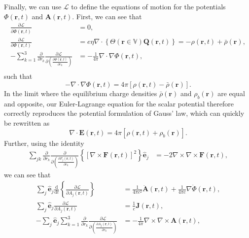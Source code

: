 \documentclass{article}
\begin{document}
Finally, we can use $\mathcal{L}$ to define the equations of motion for the potentials $\Phi(\mathbf{r},t)$ and $\mathbf{A}(\mathbf{r},t)$. First, we can see that 
\begin{equation}
\begin{split}
\frac{\partial\mathcal{L}}{\partial\dot{\Phi}(\mathbf{r},t)} &= 0,\\
\frac{\partial \mathcal{L}}{\partial \Phi(\mathbf{r},t)} &= e\eta\nabla\cdot\left\{\Theta(\mathbf{r}\in\mathbb{V})\mathbf{Q}(\mathbf{r},t)\right\}= -\rho(\mathbf{r},t) + \bar{\rho}(\mathbf{r}),\\
-\sum_{k = 1}^3\frac{\partial}{\partial r_k}\frac{\partial \mathcal{L}}{\partial\left(\frac{\partial\Phi(\mathbf{r},t)}{\partial r_k}\right)} &= -\frac{1}{4\pi}\nabla\cdot\nabla\Phi(\mathbf{r},t),\\
\end{split}
\end{equation}
such that
\begin{equation}\label{eq:poisson1}
-\nabla\cdot\nabla\Phi(\mathbf{r},t) = 4\pi\left[\rho(\mathbf{r},t) - \bar{\rho}(\mathbf{r})\right].
\end{equation}
In the limit where the equilibrium charge densities $\bar{\rho}(\mathbf{r})$ and $\rho_b(\mathbf{r})$ are equal and opposite, our Euler-Lagrange equation for the scalar potential therefore correctly reproduces the potential formulation of Gauss' law, which can quickly be rewritten as
\begin{equation}
\nabla\cdot\mathbf{E}(\mathbf{r},t) = 4\pi\left[\rho(\mathbf{r},t) + \rho_b(\mathbf{r})\right].
\end{equation}
Further, using the identity
\begin{equation}
\begin{split}
\sum_{jk}\frac{\partial}{\partial r_k}\frac{\partial}{\partial\!\left(\frac{\partial F_j(\mathbf{r},t)}{\partial r_k}\right)}\left\{\left[\nabla\times\mathbf{F}(\mathbf{r},t)\right]^2\right\}\hat{\mathbf{e}}_j &= -2\nabla\times\nabla\times\mathbf{F}(\mathbf{r},t),
\end{split}
\end{equation}
we can see that
\begin{equation}
\begin{split}
\sum_j\hat{\mathbf{e}}_j\frac{\mathrm{d}}{\mathrm{d}t}\left\{\frac{\partial\mathcal{L}}{\partial \dot{A}_j(\mathbf{r},t)}\right\} &= \frac{1}{4\pi c^2}\ddot{\mathbf{A}}(\mathbf{r},t) + \frac{1}{4\pi c}\nabla\dot{\Phi}(\mathbf{r},t),\\
\sum_j\hat{\mathbf{e}}_j\frac{\partial\mathcal{L}}{\partial A_j(\mathbf{r},t)} &= \frac{1}{c}\mathbf{J}(\mathbf{r},t),\\
-\sum_j\hat{\mathbf{e}}_j\sum_{k = 1}^3\frac{\partial}{\partial r_k}\frac{\partial \mathcal{L}}{\partial\!\left(\frac{\partial A_{j}(\mathbf{r},t)}{\partial r_k}\right)} &= -\frac{1}{4\pi}\nabla\times\nabla\times\mathbf{A}(\mathbf{r},t),
\end{split}
\end{equation}
\end{document}

